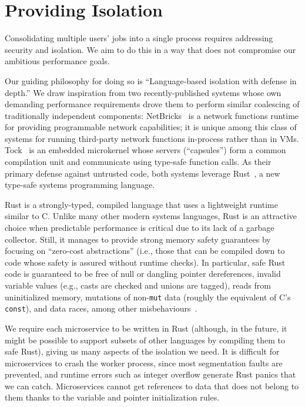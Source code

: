 \section{Providing Isolation}
\label{sec:isolation}

Consolidating multiple users' jobs into a single process requires
addressing security and isolation. We aim to do this in a way that does not
compromise our ambitious performance goals.

Our guiding philosophy for doing so is ``Language-based isolation with defense in depth.''
We draw inspiration from two recently-published systems whose own demanding
performance requirements drove them to perform similar coalescing of traditionally
independent components:  NetBricks~\cite{Panda2016} is a network functions runtime
for providing programmable network capabilities; it is unique among this class of
systems for running third-party network functions in-process rather than in VMs.
Tock~\cite{Levy2017} is an embedded microkernel whose servers (``capsules'') form
a common compilation unit and communicate using type-safe function calls.
As their primary defense against untrusted code, both systems
leverage Rust~\cite{www-rustlang}, a new type-safe systems programming language.


Rust is a strongly-typed, compiled language that uses a lightweight runtime
similar to C.  Unlike many other modern systems languages, Rust is an
attractive choice when predictable performance is critical due to its
lack of a garbage collector.  Still, it manages to provide strong memory safety
guarantees by focusing on ``zero-cost abstractions'' (i.e., those that can be
compiled down to code whose safety is assured without runtime checks).  In
particular, safe Rust code is guaranteed to be free of null or dangling pointer
dereferences, invalid variable values (e.g., casts are checked and unions are
tagged), reads from uninitialized memory, mutations of non-\texttt{mut} data (roughly
the equivalent of C's \texttt{const}), and data races, among other
misbehaviours~\cite{www-rustlang-ub}.

We require each microservice to be written in Rust (although, in the future, it
might be possible to support subsets of other languages by compiling them to safe
Rust), giving us many aspects of the isolation we need.  It is difficult for
microservices to crash the worker process, since most segmentation faults are
prevented, and runtime errors such as integer overflow generate Rust panics that we
can catch.  Microservices cannot get references to data that does not belong to them
thanks to the variable and pointer initialization rules.

